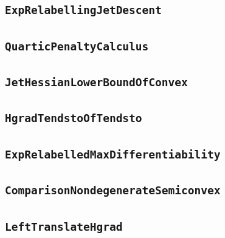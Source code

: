 \documentclass[11pt]{amsart}
\theoremstyle{definition}
\begin{document}
\subsection{\texorpdfstring{\texttt{ExpRelabellingJetDescent}}{ExpRelabellingJetDescent}}\label{node:ExpRelabellingJetDescent}


\subsection{\texorpdfstring{\texttt{QuarticPenaltyCalculus}}{QuarticPenaltyCalculus}}\label{node:QuarticPenaltyCalculus}


\subsection{\texorpdfstring{\texttt{JetHessianLowerBoundOfConvex}}{JetHessianLowerBoundOfConvex}}\label{node:JetHessianLowerBoundOfConvex}


\subsection{\texorpdfstring{\texttt{HgradTendstoOfTendsto}}{HgradTendstoOfTendsto}}\label{node:HgradTendstoOfTendsto}


\subsection{\texorpdfstring{\texttt{ExpRelabelledMaxDifferentiability}}{ExpRelabelledMaxDifferentiability}}\label{node:ExpRelabelledMaxDifferentiability}


\subsection{\texorpdfstring{\texttt{ComparisonNondegenerateSemiconvex}}{ComparisonNondegenerateSemiconvex}}\label{node:ComparisonNondegenerateSemiconvex}


\subsection{\texorpdfstring{\texttt{LeftTranslateHgrad}}{LeftTranslateHgrad}}\label{node:LeftTranslateHgrad}

\end{document}
